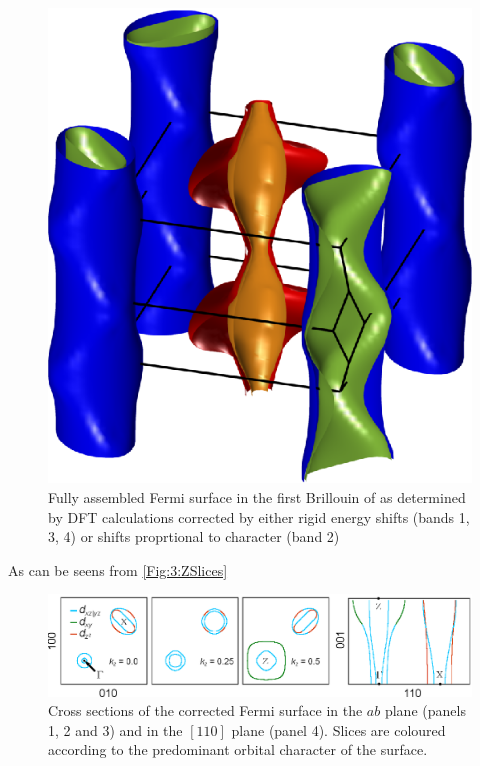 {{{\begin{figure}[h!]
\begin{center}
        \includegraphics[scale=0.7]{Chapter3-dHvABaFe2P2/Figures/AngleDepMeasurements/BandCharacterFermiSurface/FullBandCharacterFermiSurface}
        \caption{Fully assembled Fermi surface in the first Brillouin of \BaFeP as determined by DFT calculations corrected by either rigid energy shifts (bands 1, 3, 4) or shifts proprtional to \DzTwo character (band 2)}
        \label{Fig:3:FullBandCharacterFermiSurface}
    \end{center}
\end{figure}

As can be seens from \fig\ref{Fig:3:ZSlices}
\begin{figure}[h!]
    \begin{center}
        \includegraphics[scale=0.9]{Chapter3-dHvABaFe2P2/Figures/AngleDepMeasurements/ZSlices/ZSlices}
        \caption{Cross sections of the corrected Fermi surface in the $ab$ plane (panels 1, 2 and 3) and in the $[110]$ plane (panel 4). Slices are coloured according to the predominant orbital character of the surface.}
        \label{Fig:3:FullBandCharacterFermiSurface}
    \end{center}
\end{figure}

}}}
